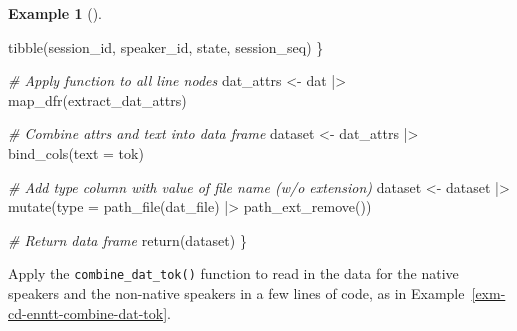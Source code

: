 \documentclass[
  letterpaper,
  DIV=11,
  numbers=noendperiod]{scrreport}
\newenvironment{Shaded}{\begin{snugshade}}{\end{snugshade}}
\newcommand{\AttributeTok}[1]{\textcolor[rgb]{0.00,0.00,0.00}{#1}}
\newcommand{\CommentTok}[1]{\textcolor[rgb]{0.00,0.00,0.00}{\textit{#1}}}
\newcommand{\FunctionTok}[1]{\textcolor[rgb]{0.00,0.00,0.00}{#1}}
\newcommand{\NormalTok}[1]{\textcolor[rgb]{0.00,0.00,0.00}{#1}}
\newcommand{\OtherTok}[1]{\textcolor[rgb]{0.00,0.00,0.00}{#1}}
\newcommand{\SpecialCharTok}[1]{\textcolor[rgb]{0.00,0.00,0.00}{#1}}
\theoremstyle{definition}
\newtheorem{example}{Example}[chapter]
\theoremstyle{remark}
\begin{document}
\begin{example}[]
\begin{Shaded}
\begin{Highlighting}[]
    \FunctionTok{tibble}\NormalTok{(session\_id, speaker\_id, state, session\_seq)}
\NormalTok{  \}}

  \CommentTok{\# Apply function to all line nodes}
\NormalTok{  dat\_attrs }\OtherTok{\textless{}{-}}
\NormalTok{    dat }\SpecialCharTok{|\textgreater{}}
    \FunctionTok{map\_dfr}\NormalTok{(extract\_dat\_attrs)}

  \CommentTok{\# Combine attrs and text into data frame}
\NormalTok{  dataset }\OtherTok{\textless{}{-}}
\NormalTok{    dat\_attrs }\SpecialCharTok{|\textgreater{}}
    \FunctionTok{bind\_cols}\NormalTok{(}\AttributeTok{text =}\NormalTok{ tok)}

  \CommentTok{\# Add type column with value of file name (w/o extension)}
\NormalTok{  dataset }\OtherTok{\textless{}{-}} 
\NormalTok{    dataset }\SpecialCharTok{|\textgreater{}}
    \FunctionTok{mutate}\NormalTok{(}\AttributeTok{type =} \FunctionTok{path\_file}\NormalTok{(dat\_file) }\SpecialCharTok{|\textgreater{}} \FunctionTok{path\_ext\_remove}\NormalTok{())}

  \CommentTok{\# Return data frame}
  \FunctionTok{return}\NormalTok{(dataset)}
\NormalTok{\}}
\end{Highlighting}
\end{Shaded}

\end{example}

Apply the \texttt{combine\_dat\_tok()} function to read in the data for
the native speakers and the non-native speakers in a few lines of code,
as in Example~\ref{exm-cd-enntt-combine-dat-tok}.
\end{document}
